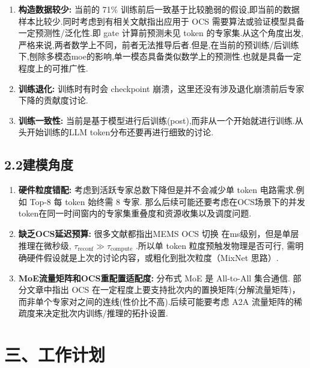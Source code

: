 \documentclass{sjtuweekly}
\begin{document}
\begin{enumerate}[label=(\arabic*), leftmargin=*]
  \item \textbf{构造数据较少:} 当前的 71\% 训练前后一致基于比较脆弱的假设,即当前的数据样本比较少.同时考虑到有相关文献指出应用于 OCS 需要算法或验证模型具备一定预测性/泛化性.即 gate 计算前预测未见 token 的专家集.从这个角度出发, 严格来说,两者数学上不同，前者无法推导后者.但是,在当前的预训练/后训练下,刨除多模态moe的影响,单一模态具备类似数学上的预测性.也就是具备一定程度上的可推广性.

  \item \textbf{训练退化:} 训练时有时会 checkpoint 崩溃，这里还没有涉及退化崩溃前后专家下降的贡献度讨论.
  \item \textbf{训练一致性:} 当前是基于模型进行后训练(post),而非从一个开始就进行训练.从头开始训练的LLM token分布还要再进行细致的讨论.
\end{enumerate}

\subsection*{2.2\quad 建模角度}

\begin{enumerate}[label=(\arabic*), leftmargin=*]
  \item \textbf{硬件粒度错配:} 考虑到活跃专家总数下降但是并不会减少单 token 电路需求.例如 Top-8 每 token 始终需 8 专家. 那么后续可能还要考虑在OCS场景下的并发token在同一时间窗内的专家集重叠度和资源收集以及调度问题.
  \item \textbf{缺乏OCS延迟预算:} 很多文献都指出MEMS OCS 切换 在ms级别，但是单层推理在微秒级, $\tau_{\text{reconf}} \gg \tau_{\text{compute}}$ .所以单 token 粒度预触发物理是否可行, 需明确硬件假设就是上次的讨论内容，或粗化到批次粒度（MixNet 思路）.
  \item \textbf{MoE流量矩阵和OCS重配置适配度:} 分布式 MoE 是 All-to-All 集合通信. 部分文章中指出 OCS 在一定程度上要支持批次内的置换矩阵(分解流量矩阵)，而非单个专家对之间的连线(性价比不高).后续可能要考虑 A2A 流量矩阵的稀疏度来决定批次内训练/推理的拓扑设置.

\end{enumerate}

\section{三、工作计划}
\end{document}
